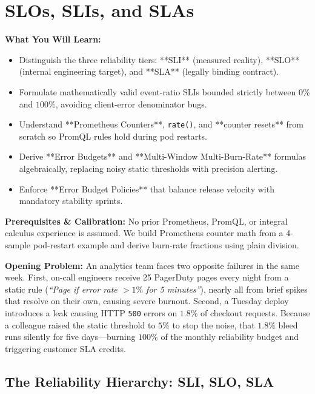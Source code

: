 \chapter{SLOs, SLIs, and SLAs}
\label{chap:slos}

\begin{chaptergoalsbox}
\textbf{What You Will Learn:}
\begin{itemize}[leftmargin=12pt]
  \item Distinguish the three reliability tiers: **SLI** (measured reality), **SLO** (internal engineering target), and **SLA** (legally binding contract).
  \item Formulate mathematically valid event-ratio SLIs bounded strictly between $0\%$ and $100\%$, avoiding client-error denominator bugs.
  \item Understand **Prometheus Counters**, \texttt{rate()}, and **counter resets** from scratch so PromQL rules hold during pod restarts.
  \item Derive **Error Budgets** and **Multi-Window Multi-Burn-Rate** formulas algebraically, replacing noisy static thresholds with precision alerting.
  \item Enforce **Error Budget Policies** that balance release velocity with mandatory stability sprints.
\end{itemize}

\textbf{Prerequisites \& Calibration:}
No prior Prometheus, PromQL, or integral calculus experience is assumed. We build Prometheus counter math from a 4-sample pod-restart example and derive burn-rate fractions using plain division.

\textbf{Opening Problem:}
An analytics team faces two opposite failures in the same week. First, on-call engineers receive 25 PagerDuty pages every night from a static rule (\textit{``Page if error rate $> 1\%$ for 5 minutes''}), nearly all from brief spikes that resolve on their own, causing severe burnout. Second, a Tuesday deploy introduces a leak causing HTTP \texttt{500} errors on $1.8\%$ of checkout requests. Because a colleague raised the static threshold to $5\%$ to stop the noise, that $1.8\%$ bleed runs silently for five days---burning $100\%$ of the monthly reliability budget and triggering customer SLA credits.
\end{chaptergoalsbox}

\section{The Reliability Hierarchy: SLI, SLO, SLA}

